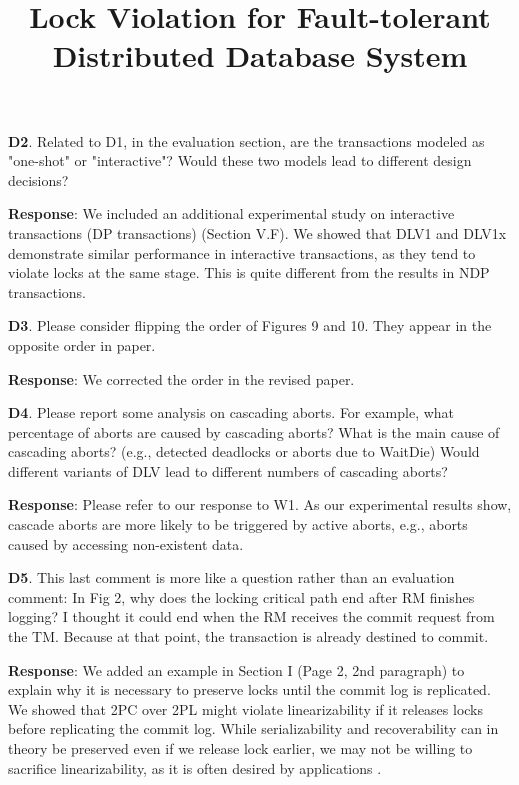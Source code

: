 \documentclass[conference]{IEEEtran}
\begin{document}
\begin{frame}{\relax}
\textbf{D2}. Related to D1, in the evaluation section, are the transactions modeled as "one-shot" or "interactive"? Would these two models lead to different design decisions?

\textbf{Response}: We included an additional experimental study on interactive transactions (DP transactions) (Section V.F). We showed that DLV1 and DLV1x demonstrate similar performance in interactive transactions, as they tend to violate locks at the same stage. This is quite different from the results in NDP transactions.

\textbf{D3}. Please consider flipping the order of Figures 9 and 10. They appear in the opposite order in paper.

\textbf{Response}: We corrected the order in the revised paper.

\textbf{D4}. Please report some analysis on cascading aborts. For example, what percentage of aborts are caused by cascading aborts? What is the main cause of cascading aborts? (e.g., detected deadlocks or aborts due to WaitDie) Would different variants of DLV lead to different numbers of cascading aborts?

\textbf{Response}: Please refer to our response to W1. As our experimental results show, cascade aborts are more likely to be triggered by active aborts, e.g., aborts caused by accessing non-existent data. 

\textbf{D5}. This last comment is more like a question rather than an evaluation comment: In Fig 2, why does the locking critical path end after RM finishes logging? I thought it could end when the RM receives the commit request from the TM. Because at that point, the transaction is already destined to commit.

\textbf{Response}: We added an example in Section I (Page 2, 2nd paragraph) to explain why it is necessary to preserve locks until the commit log is replicated. We showed that 2PC over 2PL might violate linearizability if it releases locks before replicating the commit log. While serializability and recoverability can in theory be preserved even if we release lock earlier, we may not be willing to sacrifice linearizability, as it is often desired by applications .


\end{frame}%

\title{Lock Violation for Fault-tolerant Distributed Database System}
\end{document}
